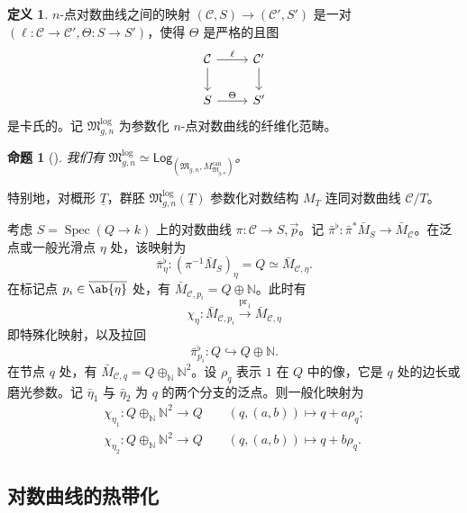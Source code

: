 \documentclass{amsart}
\newtheorem{prop}[thm]{命题}
\theoremstyle{definition}
\newtheorem{defn}[thm]{定义}
\theoremstyle{remark}
\theoremstyle{plain}
\theoremstyle{definition}
\theoremstyle{remark}
\newcommand{\N}{\mathbb{N}}
\newcommand{\mc}[1]{\mathcal{#1}}
\newcommand{\mf}[1]{\mathfrak{#1}}
\newcommand{\on}[1]{\operatorname{#1}}
\newcommand{\ms}[1]{\mathsf{#1}}
\newcommand{\ol}[1]{\overline{#1}}
\newcommand{\ul}[1]{\underline{#1}}
\newcommand{\1}{\mathbf{1}}
\newcommand{\2}{\mathbf{2}}
\newcommand{\3}{\mathbf{3}}
\DeclareMathOperator{\Spec}{Spec}
\begin{document}
\begin{defn}
    \(n\)-点对数曲线之间的映射 \((\mc{C}, S) \to (\mc{C}', S')\) 是一对 \((\ell \colon \mc{C} \to \mc{C}', \Theta \colon S \to S')\)，使得 \(\Theta\) 是严格的且图
    \begin{equation*}
    \begin{tikzcd}
        \mc{C} \ar{d} \ar{r}{\ell} & \mc{C}' \ar{d} \\
        S \ar{r}{\Theta} & S'
    \end{tikzcd}
    \end{equation*}
    是卡氏的。记 \(\mf{M}_{g,n}^{\log}\) 为参数化 \(n\)-点对数曲线的纤维化范畴。
\end{defn}

\begin{prop}[{\cite{FKato2000,Olsson2003}}]
    我们有 \(\mf{M}_{g,n}^{\log} \simeq \ms{Log}_{(\mf{M}_{g,n}, M_{\mf{M}_{g,n}}^{\on{can}})}\)。
\end{prop}

特别地，对概形 \(\ul{T}\)，群胚 \(\mf{M}_{g,n}^{\log}(\ul{T})\) 参数化对数结构 \(M_T\) 连同对数曲线 \(\mc{C} / T\)。

考虑 \(S = \Spec (Q \to k)\) 上的对数曲线 \(\pi \colon \mc{C} \to S, \vec{p}\)。记 \(\bar{\pi}^{\flat} \colon \bar{\pi}^* \bar{M}_S \to \bar{M}_{\mc{C}}\)。在泛点或一般光滑点 \(\eta\) 处，该映射为
\[ \bar{\pi}_{\eta}^{\flat} \colon (\pi^{-1} \bar{M}_S)_{\eta} = Q \simeq \bar{M}_{\mc{C}, \eta}. \]
在标记点 \(p_i \in \ol{\ab\{\eta\}}\) 处，有 \(\bar{M}_{\mc{C}, p_i} = Q \oplus \N\)。此时有
\[ \chi_{\eta} \colon \bar{M}_{\mc{C}, p_i} \xrightarrow{\on{pr}_1} \bar{M}_{\mc{C}, \eta} \]
即特殊化映射，以及拉回
\[ \bar{\pi}_{p_i}^{\flat} \colon Q \hookrightarrow Q \oplus \N. \]
在节点 \(q\) 处，有 \(\bar{M}_{\mc{C}, q} = Q \oplus_{\N} \N^2\)。设 \(\rho_q\) 表示 \(1\) 在 \(Q\) 中的像，它是 \(q\) 处的边长或磨光参数。记 \(\bar{\eta}_1\) 与 \(\bar{\eta}_2\) 为 \(q\) 的两个分支的泛点。则一般化映射为
\begin{align*}
    \chi_{\eta_1} \colon Q \oplus_{\N} \N^2 \to Q \qquad (q, (a,b)) \mapsto q + a \rho_q ;\\
    \chi_{\eta_2} \colon Q \oplus_{\N} \N^2 \to Q \qquad (q, (a,b)) \mapsto q + b \rho_q .
\end{align*}

\subsection{对数曲线的热带化}%
\label{sub:Tropicalization of log curves}
\end{document}
